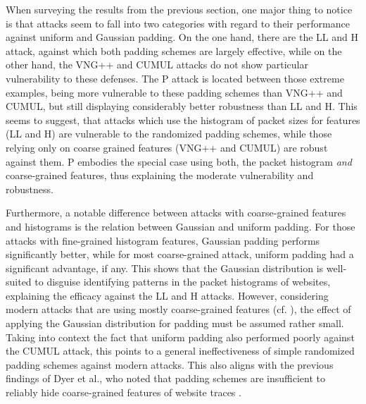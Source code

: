 \documentclass[
	ruledheaders=chapter,
	class=report,
	thesis={type=master, department=inf},
	accentcolor=1c,
	custommargins=true,
	marginpar=false,
	parskip=half-,
	fontsize=11pt,
]{tudapub}
\begin{document}
	When surveying the results from the previous section, one major thing to notice is that attacks seem to fall into two categories with regard to their performance against uniform and Gaussian padding. On the one hand, there are the LL and H attack, against which both padding schemes are largely effective, while on the other hand, the VNG++ and CUMUL attacks do not show particular vulnerability to these defenses. The P attack is located between those extreme examples, being more vulnerable to these padding schemes than VNG++ and CUMUL, but still displaying considerably better robustness than LL and H. This seems to suggest, that attacks which use the histogram of packet sizes for features (LL and H) are vulnerable to the randomized padding schemes, while those relying only on coarse grained features (VNG++ and CUMUL) are robust against them. P embodies the special case using both, the packet histogram \textit{and} coarse-grained features, thus explaining the moderate vulnerability and robustness.
	
	Furthermore, a notable difference between attacks with coarse-grained features and histograms is the relation between Gaussian and uniform padding. For those attacks with fine-grained histogram features, Gaussian padding performs significantly better, while for most coarse-grained attack, uniform padding had a significant advantage, if any. This shows that the Gaussian distribution is well-suited to disguise identifying patterns in the packet histograms of websites, explaining the efficacy against the LL and H attacks. However, considering modern attacks that are using mostly coarse-grained features (cf. \cite{Dyer2012,Wang2014,Panchenko2016,Hayes2016}), the effect of applying the Gaussian distribution for padding must be assumed rather small. Taking into context the fact that uniform padding also performed poorly against the CUMUL attack, this points to a general ineffectiveness of simple randomized padding schemes against modern attacks. This also aligns with the previous findings of Dyer et al., who noted that padding schemes are insufficient to reliably hide coarse-grained features of website traces \cite{Dyer2012}.
	
\end{document}
